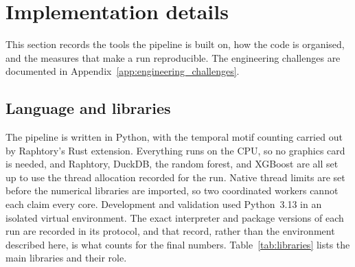 \section{Implementation details}
\label{sec:implementation}

This section records the tools the pipeline is built on, how the code is
organised, and the measures that make a run reproducible. The engineering
challenges are documented in Appendix~\ref{app:engineering_challenges}.

\subsection{Language and libraries}

The pipeline is written in Python, with the temporal motif counting carried out by
Raphtory's Rust extension. Everything runs on the CPU, so no graphics card is
needed, and Raphtory, DuckDB, the random forest, and XGBoost are all set up to use
the thread allocation recorded for the run. Native thread limits are set before
the numerical libraries are imported, so two coordinated workers cannot each
claim every core. Development and validation used
Python~3.13 in an isolated virtual environment. The exact interpreter and package
versions of each run are recorded in its protocol, and that record, rather than the
environment described here, is what counts for the final numbers.
Table~\ref{tab:libraries} lists the main libraries and their role.

